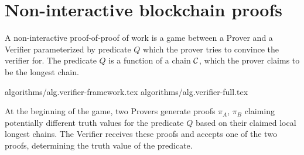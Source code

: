 \section{Non-interactive blockchain proofs}

A non-interactive proof-of-proof of work is a game between a Prover and a
Verifier parameterized by predicate $Q$ which the prover tries to convince the
verifier for. The predicate $Q$ is a function of a chain $\mathcal{C}$, which the
prover claims to be the longest chain.

{algorithms/alg.verifier-framework.tex}
{algorithms/alg.verifier-full.tex}

At the beginning of the game, two Provers generate proofs $\pi_A$, $\pi_B$
claiming potentially different truth values for the predicate $Q$ based on
their claimed local longest chains. The Verifier receives these proofs and
accepts one of the two proofs, determining the truth value of the predicate.
